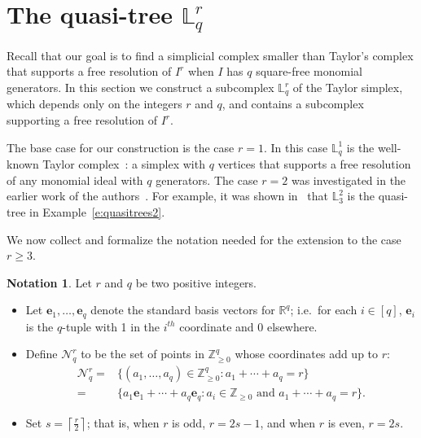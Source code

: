 \documentclass[11pt]{article}
\theoremstyle{definition}
\newtheorem{nota}[theo]{Notation}
\providecommand{\ie}{i.e.\ }
\numberwithin{equation}{section}
\newcommand{\Nrq}{\mathcal{N}^r_q}
\newcommand{\st}{\colon}
\newcommand{\LL}{\mathbb{L}}
\newcommand{\Lrq}{\mathbb{L}^r_q}
\newcommand{\ZZ}{\mathbb{Z}}
\newcommand{\be}{\mathbf{e}}
\begin{document}
\section{The quasi-tree \texorpdfstring{$\Lrq$}{Lqr}}
\label{sec:Lrq}

Recall that our goal is to find a simplicial complex smaller than
Taylor's complex that supports a free resolution of $I^r$ when $I$
has $q$ square-free monomial generators. In this section we construct
a subcomplex $\Lrq$ of the Taylor simplex, which depends only on the
integers $r$ and $q$, and contains a subcomplex supporting a free
resolution of $I^r$.

The base case for our construction is the case $r=1$. In this case
$\LL^1_q$ is the well-known Taylor complex~\cite{T}: a simplex with $q$ vertices
that supports a free resolution of any monomial ideal with
$q$ generators.  The case $r=2$ was investigated in the earlier work
of the authors~\cite{L2}. For example, it was shown in~\cite{L2}
that $\LL^2_3$ is the quasi-tree in Example~\ref{e:quasitrees2}.


We now collect and formalize the notation needed for the extension to
the case $r \geq 3$.

\begin{nota} \label{n:rqs}
Let $r$ and $q$ be two positive integers. 

\begin{itemize}
\setlength\itemsep{1em}

\item Let $\be_1, \ldots, \be_q$ denote the standard basis vectors for
$\mathbb R^q$; \ie for each $i\in [q]$, $\be_i$ is the $q$-tuple with 1 in the $i^{th}$
coordinate and 0 elsewhere.


\item Define $\Nrq$ to be the set of points in $ \ZZ_{\ge 0}^q$ whose
coordinates add up to $r$:
\begin{align*}
\Nrq = &\{(a_1,\ldots, a_q) \in \ZZ_{\ge 0}^q \st a_1 + \cdots +
a_q =r\}\\ =&\{a_1\be_1 + \cdots +a_q\be_q \st a_i \in \ZZ_{\ge 0}
{\text{ and }} a_1 + \cdots + a_q =r\}.
\end{align*}


\item Set $s=\left\lceil{\frac{r}{2}}\right\rceil$; that is, when $r$ is odd,
$r=2s-1$, and when $r$ is even, $r=2s$. 
\end{itemize}
\end{nota}
\end{document}
